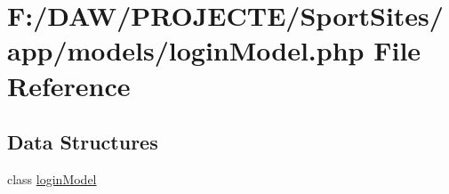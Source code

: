 \hypertarget{login_model_8php}{}\section{F\+:/\+D\+A\+W/\+P\+R\+O\+J\+E\+C\+T\+E/\+Sport\+Sites/app/models/login\+Model.php File Reference}
\label{login_model_8php}
\subsection*{Data Structures}
\begin{DoxyCompactItemize}
\item 
class \hyperlink{classlogin_model}{login\+Model}
\end{DoxyCompactItemize}
